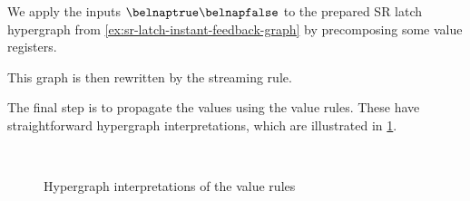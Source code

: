 \begin{example}\label{ex:sr-latch-streaming-graph}
    We apply the inputs \(\belnaptrue\belnapfalse\) to the prepared SR latch
    hypergraph from \cref{ex:sr-latch-instant-feedback-graph} by precomposing
    some value registers.
    \vspace{-1em}
    \begin{center}
    \end{center}
    This graph is then rewritten by the streaming rule.
    \vspace{-2em}
    \begin{center}
    \end{center}
\end{example}

The final step is to propagate the values using the value rules.
These have straightforward hypergraph interpretations, which are illustrated
in \cref{fig:graph-values}.

\begin{figure}
    \centering
    \scalebox{0.8}{}
    \quad
    \raisebox{0.5em}{\scalebox{0.8}{}}
    \\
    \scalebox{0.8}{}
    \quad
    \raisebox{1em}{\scalebox{0.8}{}}
    \caption{Hypergraph interpretations of the value rules}
    \label{fig:graph-values}
\end{figure}

